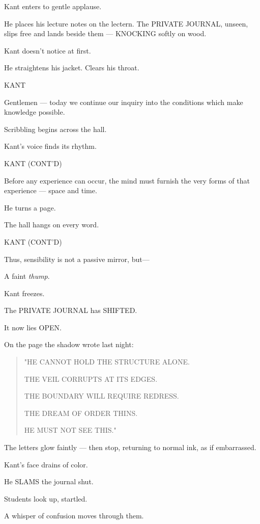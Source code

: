 \documentclass[12pt]{article}
\newenvironment{dialogue}[1]{%
  \vspace{0.8\baselineskip}%
  \noindent\hspace*{2.3in}\textsc{#1}\par%
  \noindent\hspace*{1.5in}\begin{minipage}[t]{4.5in}%
}{%
  \end{minipage}\par%
}
\begin{document}
Kant enters to gentle applause.

He places his lecture notes on the lectern.
The PRIVATE JOURNAL, unseen, slips free and lands beside them
— KNOCKING softly on wood.

Kant doesn’t notice at first.

He straightens his jacket.
Clears his throat.

\begin{dialogue}{KANT}
Gentlemen — today we continue our inquiry into the conditions
which make knowledge possible.
\end{dialogue}

Scribbling begins across the hall.

Kant’s voice finds its rhythm.

\begin{dialogue}{KANT (CONT'D)}
Before any experience can occur, the mind must furnish the
very forms of that experience — space and time.
\end{dialogue}

He turns a page.

The hall hangs on every word.

\begin{dialogue}{KANT (CONT'D)}
Thus, sensibility is not a passive mirror, but—
\end{dialogue}

A faint \emph{thump}.

Kant freezes.

The PRIVATE JOURNAL has SHIFTED.

It now lies OPEN.

On the page the shadow wrote last night:

\begin{quote}
"HE CANNOT HOLD THE STRUCTURE ALONE.

THE VEIL CORRUPTS AT ITS EDGES.

THE BOUNDARY WILL REQUIRE REDRESS.

THE DREAM OF ORDER THINS.

HE MUST NOT SEE THIS."
\end{quote}

The letters glow faintly —
then stop, returning to normal ink, as if embarrassed.

Kant’s face drains of color.

He SLAMS the journal shut.

Students look up, startled.

A whisper of confusion moves through them.
\end{document}
